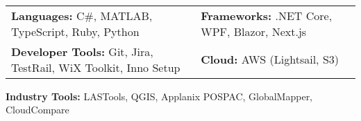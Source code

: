 \

\begin{tabular}{p{11cm}p{8cm}}
    {\textbf{Languages:} C\#, MATLAB, TypeScript, Ruby, Python} & {\textbf{Frameworks:} .NET Core, WPF, Blazor, Next.js} \\
    {\textbf{Developer Tools:} Git, Jira, TestRail, WiX Toolkit, Inno Setup} & {\textbf{Cloud:} AWS (Lightsail, S3)}  \\
\end{tabular}
\textbf{Industry Tools:} LASTools, QGIS, Applanix POSPAC, GlobalMapper, CloudCompare 

